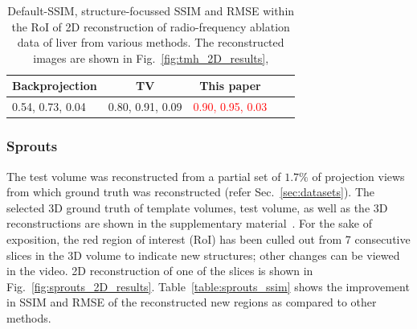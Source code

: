 \documentclass[journal]{IEEEtran}
\begin{document}
\begin{table}[!h]
  \centering
  \caption{Default-SSIM, structure-focussed SSIM and RMSE within the RoI of 2D reconstruction of radio-frequency ablation data of liver from various methods.  
The  reconstructed images are shown in Fig.~\ref{fig:tmh_2D_results},}
\begin{tabular}{|l|c|c|c|c|}
\hline \textbf{Backprojection} & \textbf{TV} &
\textbf{This paper} \\ \hline 0.54, 0.73, 0.04
& 0.80, 0.91, 0.09 & \textcolor{red}{0.90, 0.95, 0.03} \\ \hline 
\end{tabular}
\label{table:tmh_ssim}
\end{table}



\subsubsection{\textbf{Sprouts}}
\label{Sec:sprouts_spatially_varying}

The test volume was reconstructed from a partial set of  
 $1.7\%$ of projection views
from which ground truth was reconstructed (refer
Sec.~\ref{sec:datasets}). The selected 3D ground truth of template
volumes, test volume, as well as the 3D reconstructions are shown in
the supplementary material~\cite{supp_paper}. For the sake of
exposition, the red region of interest (RoI) has been culled out from
7 consecutive slices in the 3D volume to indicate new structures;
other changes can be viewed in the video.  2D reconstruction of one of
the slices is shown in Fig.~\ref{fig:sprouts_2D_results}.
Table~\ref{table:sprouts_ssim} shows the improvement in SSIM and RMSE of the
reconstructed new regions as compared to other methods. 
\end{document}
